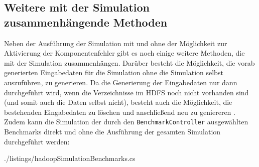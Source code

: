 \subsection{Weitere mit der Simulation zusammenhängende Methoden}\label{sec:simulationUtilities}

Neben der Ausführung der Simulation mit und ohne der Möglichkeit zur Aktivierung der Komponentenfehler gibt es noch einige weitere Methoden, die mit der Simulation zusammenhängen.
Darüber besteht die Möglichkeit, die vorab generierten Eingabedaten für die Simulation ohne die Simulation selbst auszuführen, zu generieren.
Da die Generierung der Eingabedaten nur dann durchgeführt wird, wenn die Verzeichnisse im \ac{HDFS} noch nicht vorhanden sind (und somit auch die Daten selbst nicht), besteht auch die Möglichkeit, die bestehenden Eingabedaten zu löschen und anschließend neu zu geniereren .
Zudem kann die Simulation der durch den \texttt{BenchmarkController} ausgewählten Benchmarks direkt und ohne die Ausführung der gesamten Simulation durchgeführt werden:


{./listings/hadoopSimulationBenchmarks.cs}
